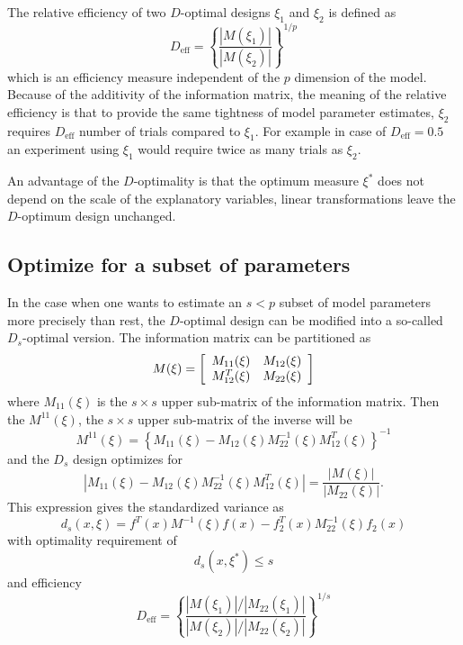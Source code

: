 \documentclass[12pt]{iopart}
\begin{document}
The relative efficiency of two $D$-optimal designs $\xi_1$ and $\xi_2$ is defined as
\begin{equation}
D_\mathrm{eff} = \left\{\frac{|M(\xi_1)|}{|M(\xi_2)|}\right\}^{1/p}
\end{equation}
which is an efficiency measure independent of the $p$ dimension of the model. Because of the additivity of the information matrix, the meaning of the relative efficiency is that to provide the same tightness of model parameter estimates, $\xi_2$ requires $D_\mathrm{eff}$ number of trials compared to $\xi_1$. For example in case of $D_\mathrm{eff} = 0.5$ an experiment using $\xi_1$ would require twice as many trials as $\xi_2$.

An advantage of the $D$-optimality is that the optimum measure $\xi^*$ does not depend on the scale of the explanatory variables, linear transformations leave the $D$-optimum design unchanged.


\subsection{Optimize for a subset of parameters}

In the case when one wants to estimate an $s < p$ subset of model parameters more precisely than rest, the $D$-optimal design can be modified into a so-called $D_s$-optimal version. The information matrix can be partitioned as
\begin{equation}
M(\xi) = \left[
  \begin{array}{l l}
    M_{11}(\xi)   & M_{12}(\xi)\\
    M^T_{12}(\xi) & M_{22}(\xi)
  \end{array} \right]
\end{equation}
where $M_{11}(\xi)$ is the $s \times s$ upper sub-matrix of the information matrix. Then the $M^{11}(\xi)$, the $s \times s$ upper sub-matrix of the inverse will be
\begin{equation}
M^{11}(\xi) = \left\{M_{11}(\xi) - M_{12}(\xi)M^{-1}_{22}(\xi)M^T_{12}(\xi)\right\}^{-1}
\end{equation}
and the $D_s$ design optimizes for 
\begin{equation}
|M_{11}(\xi) - M_{12}(\xi)M^{-1}_{22}(\xi)M^T_{12}(\xi)| = \frac{|M(\xi)|}{|M_{22}(\xi)|}.
\end{equation}
This expression gives the standardized variance as
\begin{equation}
d_s(x, \xi) = f^T(x) M^{-1}(\xi)f(x) - f_2^T(x) M_{22}^{-1}(\xi)f_2(x)
\label{eq:dsvar}
\end{equation}
with optimality requirement of
\begin{equation}
d_s(x, \xi^*) \leq s
\end{equation}
and efficiency
\begin{equation}
D_\mathrm{eff} = \left\{\frac{|M(\xi_1)|/|M_{22}(\xi_1)|}{|M(\xi_2)|/|M_{22}(\xi_2)|}\right\}^{1/s}
\end{equation}
\end{document}
